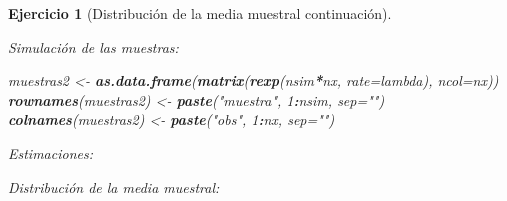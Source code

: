 \documentclass[
  spanish,
  10pt,
]{book}
\newenvironment{Shaded}{\begin{snugshade}}{\end{snugshade}}
\newcommand{\AttributeTok}[1]{\textcolor[rgb]{0.13,0.29,0.53}{#1}}
\newcommand{\DecValTok}[1]{\textcolor[rgb]{0.00,0.00,0.81}{#1}}
\newcommand{\FunctionTok}[1]{\textcolor[rgb]{0.13,0.29,0.53}{\textbf{#1}}}
\newcommand{\NormalTok}[1]{#1}
\newcommand{\OtherTok}[1]{\textcolor[rgb]{0.56,0.35,0.01}{#1}}
\newcommand{\SpecialCharTok}[1]{\textcolor[rgb]{0.81,0.36,0.00}{\textbf{#1}}}
\newcommand{\StringTok}[1]{\textcolor[rgb]{0.31,0.60,0.02}{#1}}
\theoremstyle{break}
\newtheorem{exercise}{Ejercicio}[chapter]
\theoremstyle{nonumberplain}
\begin{document}
\begin{exercise}[Distribución de la media muestral continuación]
\begin{enumerate}
  Simulación de las muestras:

\begin{Shaded}
\begin{Highlighting}[]
\NormalTok{muestras2 }\OtherTok{\textless{}{-}} \FunctionTok{as.data.frame}\NormalTok{(}\FunctionTok{matrix}\NormalTok{(}\FunctionTok{rexp}\NormalTok{(nsim}\SpecialCharTok{*}\NormalTok{nx, }\AttributeTok{rate=}\NormalTok{lambda), }\AttributeTok{ncol=}\NormalTok{nx))}
\FunctionTok{rownames}\NormalTok{(muestras2) }\OtherTok{\textless{}{-}} \FunctionTok{paste}\NormalTok{(}\StringTok{"muestra"}\NormalTok{, }\DecValTok{1}\SpecialCharTok{:}\NormalTok{nsim, }\AttributeTok{sep=}\StringTok{""}\NormalTok{)}
\FunctionTok{colnames}\NormalTok{(muestras2) }\OtherTok{\textless{}{-}} \FunctionTok{paste}\NormalTok{(}\StringTok{"obs"}\NormalTok{, }\DecValTok{1}\SpecialCharTok{:}\NormalTok{nx, }\AttributeTok{sep=}\StringTok{""}\NormalTok{)}
\end{Highlighting}
\end{Shaded}

  Estimaciones:

\begin{Shaded}
\end{Shaded}

  Distribución de la media muestral:


\end{enumerate}
\end{exercise}
\end{document}
